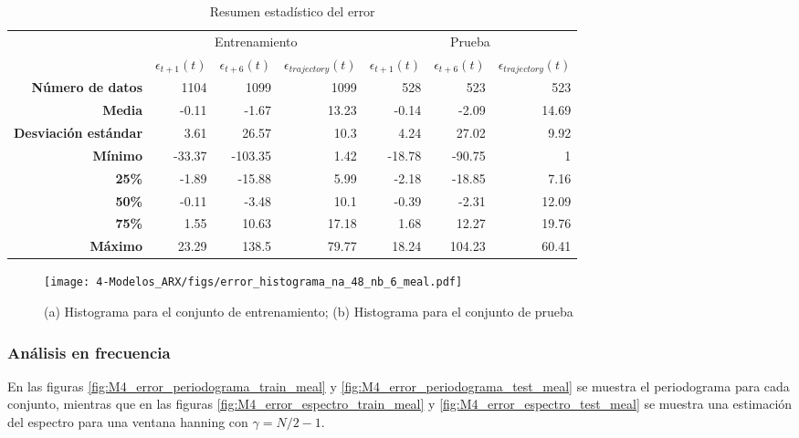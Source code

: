 \begin{table}[H]
	\centering
	\begin{tabular}{rrrr|rrr}
		\hline \hline
		& \multicolumn{3}{c|}{Entrenamiento} & \multicolumn{3}{c}{Prueba} \\
		& $\epsilon_{t+1}(t)$  & $\epsilon_{t+6}(t)$       & $\epsilon_{trajectory}(t)$     & $\epsilon_{t+1}(t)$      & $\epsilon_{t+6}(t)$      &$\epsilon_{trajectory}(t)$     \\ \hline
		\textbf{Número de datos}     & 1104       & 1099      & 1099      & 528     & 523     & 523    \\
		\textbf{Media}               & -0.11      & -1.67     & 13.23     & -0.14   & -2.09   & 14.69  \\
		\textbf{Desviación estándar} & 3.61       & 26.57     & 10.3      & 4.24    & 27.02   & 9.92   \\
		\textbf{Mínimo}              & -33.37     & -103.35   & 1.42      & -18.78  & -90.75  & 1      \\
		\textbf{25\%}                & -1.89      & -15.88    & 5.99      & -2.18   & -18.85  & 7.16   \\
		\textbf{50\%}                & -0.11      & -3.48     & 10.1      & -0.39   & -2.31   & 12.09  \\
		\textbf{75\%}                & 1.55       & 10.63     & 17.18     & 1.68    & 12.27   & 19.76  \\
		\textbf{Máximo}              & 23.29      & 138.5     & 79.77     & 18.24   & 104.23  & 60.41  \\ \hline \hline
	\end{tabular}
	\caption{Resumen estadístico del error}
	\label{table:M4_error_meal}
\end{table}




\begin{figure}[H]
	\centering
	\texttt{[image: 4-Modelos\_ARX/figs/error\_histograma\_na\_48\_nb\_6\_meal.pdf]}
	\caption{(a) Histograma para el conjunto de entrenamiento; (b) Histograma para el conjunto de prueba}
	\label{fig:M4_histograma_error_meal}
\end{figure}



\subsubsection*{Análisis en frecuencia}


En las figuras \ref{fig:M4_error_periodograma_train_meal} y \ref{fig:M4_error_periodograma_test_meal} se muestra el periodograma para cada conjunto, mientras que en las figuras \ref{fig:M4_error_espectro_train_meal} y \ref{fig:M4_error_espectro_test_meal} se muestra una estimación del espectro para una ventana hanning con $\gamma = N/2 - 1$.

